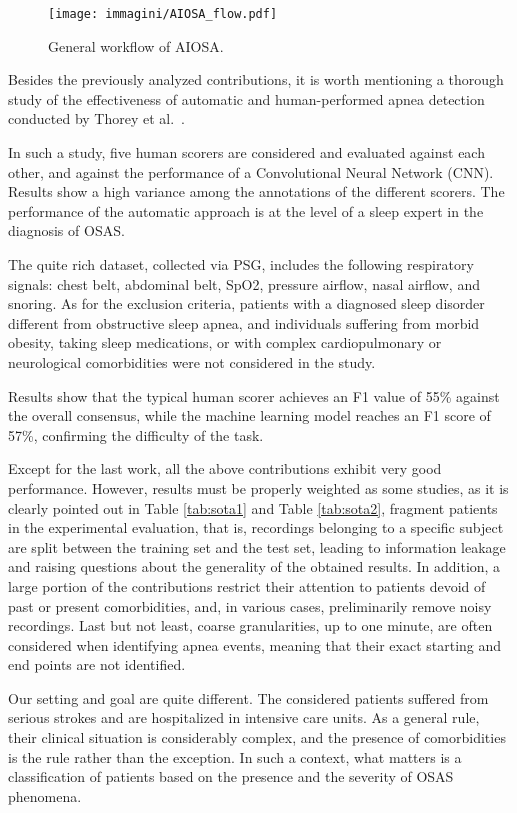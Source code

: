 \documentclass[5p,twocolumn,lefttitle]{elsarticle}
\begin{document}
\begin{figure*}[tb]
    \centering
    \texttt{[image: immagini/AIOSA\_flow.pdf]}
    \caption{General workflow of AIOSA.}
    \label{fig:AIOSA_flow}
\end{figure*}


Besides the previously analyzed contributions, it is worth mentioning a thorough study of the effectiveness of automatic and human-performed apnea detection conducted by Thorey et al.\ \cite{DBLP:conf/embc/ThoreyHAD19}. 

In such a study, five human scorers are considered and evaluated against each other, and against the performance of a Convolutional Neural Network (CNN). Results show a high variance among the annotations of the different scorers. The performance of the automatic approach is at the level of a sleep expert in the diagnosis of OSAS. 

The quite rich dataset, collected via PSG, includes the following respiratory signals: chest belt, abdominal belt, SpO2, pressure airflow, nasal airflow, and snoring. As for the exclusion criteria, patients with a diagnosed sleep disorder different from obstructive sleep apnea, and individuals suffering from morbid obesity, taking sleep medications, or with complex cardiopulmonary or neurological comorbidities were not considered in the study. 

Results show that the typical human scorer achieves an F1 value of 55\% against the overall consensus, while the machine learning model reaches an F1 score of 57\%, confirming the difficulty of the task.

Except for the last work, all the above contributions exhibit very good performance. 
However, results must be properly weighted as some studies, as it is clearly pointed out in Table \ref{tab:sota1} and Table \ref{tab:sota2}, fragment patients in the experimental evaluation, that is, recordings belonging to a specific subject are split between the training set and the test set, leading to information leakage and raising questions about the generality of the obtained results. In addition, a large portion of the contributions restrict their attention to patients devoid of past or present comorbidities, and, in various cases, preliminarily remove noisy recordings. Last but not least, coarse granularities, up to one minute, are often considered when identifying apnea events, meaning that their exact starting and end points are not identified.

Our setting and goal are quite different. The considered patients suffered from serious strokes and are hospitalized in intensive care units. As a general rule, their clinical situation is considerably complex, and the presence of comorbidities is the rule rather than the exception. In such a context, what matters is a classification of patients based on the presence and the severity of OSAS phenomena. 
\end{document}
